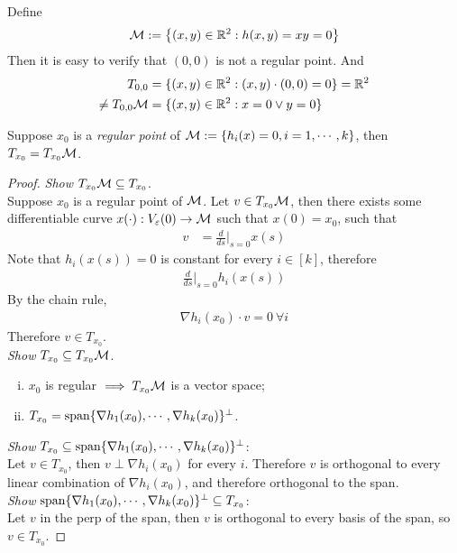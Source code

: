 \documentclass{article}
\begin{document}
   	\begin{example}
   		Define
   		\begin{align}
   			\mathcal{{M}} := \left \{
   			(x, y) \in \mathbb{R}^2:
   			h(x,y) = xy = 0
   			\right \}
   		\end{align}
   		Then it is easy to verify that $(0,0)$ is not a regular point. And
   		\begin{align}
   			T_{0,0} &= \{(x, y) \in \mathbb{R}^2: (x, y) \cdot (0,0) = 0\} = \mathbb{R}^2 \\
   			\neq T_{0,0}\mathcal{{M}} &= \{(x, y) \in \mathbb{R}^2: x = 0 \lor y = 0\}
   		\end{align}
   	\end{example}
   	
   	\begin{theorem}
   		Suppose $x_0$ is a \emph{regular point} of $\mathcal{{M}} := \{h_i(x) = 0, i=1,\cdots,k\}$, then $T_{x_0} = T_{x_0} \mathcal{{M}}$.
   	\end{theorem}
   	
   	\begin{proof}
   		\emph{Show} $T_{x_0} \mathcal{{M}} \subseteq T_{x_0}$.\\
   		Suppose $x_0$ is a regular point of $\mathcal{{M}}$.
   		Let $v \in T_{x_0} \mathcal{{M}}$, then there exists some differentiable curve $x(\cdot):V_\varepsilon(0) \to \mathcal{{M}}$ such that $x(0) = x_0$, such that
   		\begin{align}
   			v &= \frac{d}{ds} \bigg \vert_{s=0} x(s)
   		\end{align}
   		Note that $h_i(x(s)) = 0$ is constant for every $i \in [k]$, therefore
   		\begin{align}
   			\frac{d}{ds} \bigg \vert_{s=0} h_i(x(s))
   		\end{align}
   		By the chain rule, 
   		\begin{align}
   			\nabla h_i(x_0)\cdot v = 0\ \forall i
   		\end{align}
   		Therefore $v \in T_{x_0}$. \\
   		\emph{Show} $T_{x_0} \subseteq T_{x_0} \mathcal{{M}}$.
   		\begin{enumerate}[(i)]
   			\item $x_0$ is regular $\implies T_{x_0} \mathcal{{M}}$ is a vector space;
   			\item $T_{x_0} = \text{{span}}\{\nabla h_1 (x_0), \cdots, \nabla h_k(x_0)\}^\perp$.
   		\end{enumerate}
   		\emph{Show} $T_{x_0} \subseteq \text{{span}}\{\nabla h_1 (x_0), \cdots, \nabla h_k(x_0)\}^\perp$: \\
   		Let $v \in T_{x_0}$, then $v \perp \nabla h_i(x_0)$ for every $i$. Therefore $v$ is orthogonal to every linear combination of $\nabla h_i(x_0)$, and therefore orthogonal to the span.\\
   		\emph{Show} $\text{{span}}\{\nabla h_1 (x_0), \cdots, \nabla h_k(x_0)\}^\perp \subseteq T_{x_0}$: \\
   		Let $v$ in the perp of the span, then $v$ is orthogonal to every basis of the span, so $v \in T_{x_0}$.
   	\end{proof}
   	
\end{document}
